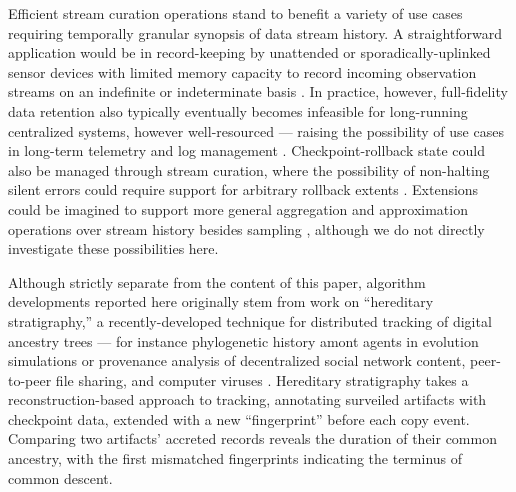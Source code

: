 Efficient stream curation operations stand to benefit a variety of use cases requiring temporally granular synopsis of data stream history.
A straightforward application would be in record-keeping by unattended or sporadically-uplinked sensor devices with limited memory capacity to record incoming observation streams on an indefinite or indeterminate basis \citep{jain2022survey}.
In practice, however, full-fidelity data retention also typically eventually becomes infeasible for long-running centralized systems, however well-resourced --- raising the possibility of use cases in long-term telemetry and log management \citep{kent2006guide,miebach2002hubble}.
Checkpoint-rollback state could also be managed through stream curation, where the possibility of non-halting silent errors could require support for arbitrary rollback extents \citep{aupy2013combination}.
Extensions could be imagined to support more general aggregation and approximation operations over stream history besides sampling \citep{schoellhammer2024lightweight}, although we do not directly investigate these possibilities here.


Although strictly separate from the content of this paper, algorithm developments reported here originally stem from work on ``hereditary stratigraphy,'' a recently-developed technique for distributed tracking of digital ancestry trees --- for instance phylogenetic history amont agents in evolution simulations or provenance analysis of decentralized social network content, peer-to-peer file sharing, and computer viruses \citep{moreno2022hereditary}.
Hereditary stratigraphy takes a reconstruction-based approach to tracking, annotating surveiled artifacts with checkpoint data, extended with a new ``fingerprint'' before each copy event.
Comparing two artifacts' accreted records reveals the duration of their common ancestry, with the first mismatched fingerprints indicating the terminus of common descent.


